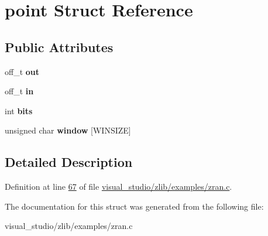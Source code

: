 \hypertarget{structpoint}{}\section{point Struct Reference}
\label{structpoint}
\subsection*{Public Attributes}
\begin{DoxyCompactItemize}
\item 
\mbox{\label{structpoint_abcfd4d3772b23166cd062d3d266c136d}} 
off\+\_\+t {\bfseries out}
\item 
\mbox{\label{structpoint_a16081c689cb453c89d844ffc88a7a211}} 
off\+\_\+t {\bfseries in}
\item 
\mbox{\label{structpoint_ab8eed5134882b57585186317509c108d}} 
int {\bfseries bits}
\item 
\mbox{\label{structpoint_a33ea8f4315cb5539d827e6297cacb310}} 
unsigned char {\bfseries window} \mbox{[}W\+I\+N\+S\+I\+ZE\mbox{]}
\end{DoxyCompactItemize}


\subsection{Detailed Description}


Definition at line \hyperlink{visual__studio_2zlib_2examples_2zran_8c_source_l00067}{67} of file \hyperlink{visual__studio_2zlib_2examples_2zran_8c_source}{visual\+\_\+studio/zlib/examples/zran.\+c}.



The documentation for this struct was generated from the following file\+:\begin{DoxyCompactItemize}
\item 
visual\+\_\+studio/zlib/examples/zran.\+c\end{DoxyCompactItemize}
